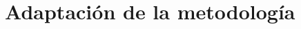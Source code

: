 \section{Adaptación de la metodología}





     
                                         




        
